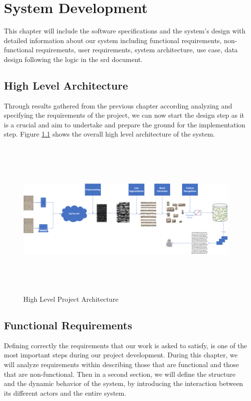 \chapter{System Development}
\label{ch:system-development}
This chapter will include the software specifications and the system's design with detailed information about our system including functional requirements, non-functional requirements, user requirements, system architecture, use case, data design following the logic in the \acrshort{srd} document.

\section{High Level Architecture}
Through results gathered from the previous chapter according analyzing and specifying the requirements of the project, we can now start the design step as it is a crucial and aim to undertake and prepare the ground for the implementation step. Figure \ref{fig:system-architecture} shows the overall high level architecture of the system.

\begin{figure}[!htb]
    \centering
    \includegraphics[width=17cm,height=8cm]{images/system-arch.png}
    \caption{High Level Project Architecture}
    \label{fig:system-architecture}
\end{figure}

\pagebreak

\section{Functional Requirements}
Defining correctly the requirements that our work is asked to satisfy, is one of the most important steps during our project development. During this chapter, we will analyze requirements within describing those that are functional and those that are non-functional. Then in a second section, we will define the structure and the dynamic behavior of the system, by introducing the interaction between its different actors and the entire system. \\

